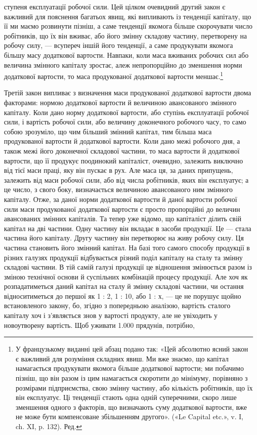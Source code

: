 \parcont{}  %
ступеня експлуатації робочої сили. Цей цілком очевидний другий
закон є важливий для пояснення багатьох явищ, які випливають
із тенденції капіталу, що її ми маємо розвинути пізніш,
а саме тенденції якомога більше скорочувати число робітників,
що їх він вживає, або його змінну складову частину, перетворену
на робочу силу, — всупереч іншій його тенденції, а саме продукувати
якомога більшу масу додаткової вартости. Навпаки, коли
маса вживаних робочих сил або величина змінного капіталу
зростає, алеж непропорційно до зменшення норми додаткової
вартости, то маса продукованої додаткової вартости меншає.\footnote*{
У французькому виданні цей абзац подано так: «Цей абсолютно
ясний закон є важливий для розуміння складних явиш. Ми вже знаємо,
що капітал намагається продукувати якомога більше додаткової вартости;
ми побачимо пізніш, що він разом із цим намагається скоротити до
мінімуму, порівняно з розмірами підприємства, свою змінну частину,
або кількість робітників, що їх він експлуатує. Ці тенденції стають одна
одній суперечними, скоро лише зменшення одного з факторів, що визначають
суму додаткової вартости, вже не може бути компенсоване збільшенням
другого». («Le Capital etc.», v. I, ch. XI, p. 132). Ред.
}

Третій закон випливає з визначення маси продукованої додаткової
вартости двома факторами: нормою додаткової вартости й
величиною авансованого змінного капіталу. Коли дано норму
додаткової вартости, або ступінь експлуатації робочої сили,
і вартість робочої сили, або величину доконечного робочого
часу, то само собою зрозуміло, що чим більший змінний капітал,
тим більша маса продукованої вартости й додаткової вартости.
Коли дано межі робочого дня, а також межі його доконечної
складової частини, то маса вартости й додаткової вартости,
що її продукує поодинокий капіталіст, очевидно, залежить
виключно від тієї маси праці, яку він пускає в рух. Але
маса ця, за даних припущень, залежить від маси робочої сили,
або від числа робітників, яких він експлуатує; а це число, з
свого боку, визначається величиною авансованого ним змінного
капіталу. Отже, за даної норми додаткової вартости й даної вартости
робочої сили маси продукованої додаткової вартости є
просто пропорційні до величин авансованих змінних капіталів.
Та тепер уже відомо, що капіталіст ділить свій капітал на
дві частини. Одну частину він вкладає в засоби продукції. Це —
стала частина його капіталу. Другу частину він перетворює на
живу робочу силу. Ця частина становить його змінний капітал.
На базі того самого способу продукції в різних галузях продукції
відбувається різний поділ капіталу на сталу та змінну складові
частини. В тій самій галузі продукції це відношення змінюється
разом із зміною технічної основи й суспільних комбінацій процесу
продукції. Але хоч як розпадатиметься даний капітал на сталу
й змінну складові частини, чи остання відноситиметься до першої
як 1 : 2, 1 : 10, або 1 : х, — це не порушує щойно встановленого
закону, бо, згідно з попередньою аналізою, вартість сталого капіталу
хоч і з’являється знов у вартості продукту, але не увіходить
у новоутворену вартість. Щоб уживати 1.000 прядунів, потрібно,
\parbreak{}  %
